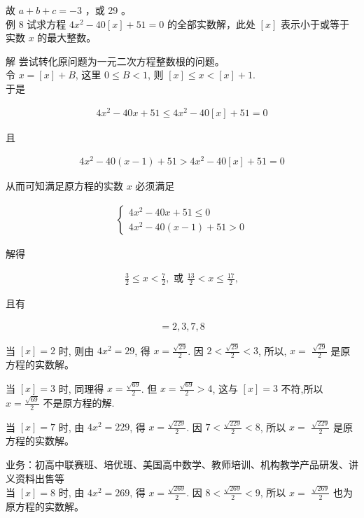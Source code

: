 \documentclass[10pt]{article}
\begin{document}
故 $a+b+c=-3$ ，或 29 。\\
例 8 试求方程 $4 x^{2}-40[x]+51=0$ 的全部实数解，此处 $[x]$ 表示小于或等于实数 $x$ 的最大整数。

解 尝试转化原问题为一元二次方程整数根的问题。\\
令 $x=[x]+B$, 这里 $0 \leqslant B<1$, 则 $[x] \leqslant x<[x]+1$.\\
于是

\begin{align*}
4 x^{2}-40 x+51 \leqslant 4 x^{2}-40[x]+51=0
\end{align*}

且

\begin{align*}
4 x^{2}-40(x-1)+51>4 x^{2}-40[x]+51=0
\end{align*}

从而可知满足原方程的实数 $x$ 必须满足

\begin{align*}
\left\{\begin{array}{l}
4 x^{2}-40 x+51 \leqslant 0 \\
4 x^{2}-40(x-1)+51>0
\end{array}\right.
\end{align*}

解得

\begin{align*}
\frac{3}{2} \leqslant x<\frac{7}{2}, \text { 或 } \frac{13}{2}<x \leqslant \frac{17}{2}, \tag{1}
\end{align*}

且有

\begin{align*}
[x]=2,3,7,8
\end{align*}

当 $[x]=2$ 时, 则由 $4 x^{2}=29$, 得 $x=\frac{\sqrt{29}}{2}$. 因 $2<\frac{\sqrt{29}}{2}<3$, 所以, $x=$ $\frac{\sqrt{29}}{2}$ 是原方程的实数解。

当 $[x]=3$ 时, 同理得 $x=\frac{\sqrt{69}}{2}$. 但 $x=\frac{\sqrt{69}}{2}>4$, 这与 $[x]=3$ 不符,所以 $x=\frac{\sqrt{69}}{2}$ 不是原方程的解.

当 $[x]=7$ 时, 由 $4 x^{2}=229$, 得 $x=\frac{\sqrt{229}}{2}$. 因 $7<\frac{\sqrt{229}}{2}<8$, 所以 $x=$ $\frac{\sqrt{229}}{2}$ 是原方程的实数解。

业务：初高中联赛班、培优班、美国高中数学、教师培训、机构教学产品研发、讲义资料出售等\\
当 $[x]=8$ 时, 由 $4 x^{2}=269$, 得 $x=\frac{\sqrt{269}}{2}$. 因 $8<\frac{\sqrt{269}}{2}<9$, 所以 $x=$ $\frac{\sqrt{269}}{2}$ 也为原方程的实数解。
\end{document}
